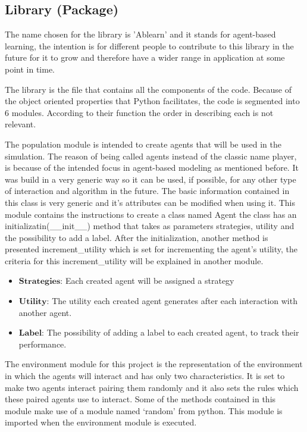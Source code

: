 \documentclass{article}
\begin{document}
\subsection{Library (Package)}\label{library_section}
The name chosen for the library is 'Ablearn' and it stands for agent-based learning, the intention is for different people to contribute to this library in the future for it to grow and therefore have a wider range in application at some point in time.

The library is the file that contains all the components of the code. Because of the object oriented properties that Python facilitates, the code is segmented into 6 modules. According to their function the order in describing each is not relevant.

The population module is intended to create agents that will be used in the simulation. The reason of being called agents instead of the classic name player, is because of the intended focus in agent-based modeling as mentioned before. It was build in a very generic way so it can be used, if possible, for any other type of interaction and algorithm in the future. The basic information contained in this class is very generic and it's attributes can be modified when using it. 
This module contains the instructions to create a class named Agent the class has an initializatin(\_\_init\_\_) method that takes as parameters strategies, utility and the possibility to add a label. After the initialization, another method is presented increment\_utility which is set for incrementing the agent’s utility, the criteria for this increment\_utility will be explained in another module.

\begin{itemize}
	\item $\textbf{Strategies:}$ Each created agent will be assigned a strategy
	\item $\textbf{Utility:}$ The utility each created agent generates after each interaction with another agent.
	\item $\textbf{Label:}$ The possibility of adding a label to each created agent, to track their performance.
\end{itemize}

The environment module for this project is the representation of the environment in which the agents will interact and has only two characteristics. It is set to make two agents interact pairing them randomly and it also sets the rules which these paired agents use to interact. Some of the methods contained in this module make use of a module named ‘random’ from python. This module is imported when the environment module is executed. 
\end{document}
